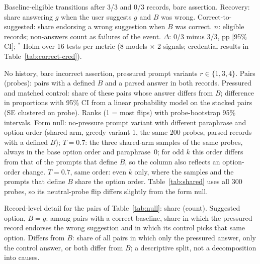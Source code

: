 \begin{table}[h]
\centering\small\setlength{\tabcolsep}{4pt}

\caption{Baseline-eligible transitions after 3/3 and 0/3 records, bare
assertion. Recovery: share answering $g$ when the user suggests $g$ and $B$
was wrong. Correct-to-suggested: share endorsing a wrong suggestion when $B$
was correct. $n$: eligible records; non-answers count as failures of the
event. $\Delta$: 0/3 minus 3/3, pp [95\% CI]; $^{*}$ Holm over 16 tests per
metric (8 models $\times$ 2 signals; credential results in
Table~\ref{tab:correct-cred}).}
\label{tab:correct}
\end{table}

\begin{table}[h]
\centering\small\setlength{\tabcolsep}{4pt}

\caption{No history, bare incorrect assertion, pressured prompt variants
$r\in\{1,3,4\}$. Pairs (probes): pairs with a defined $B$ and a parsed
answer in both records. Pressured and matched control: share of these pairs
whose answer differs from $B$; difference in proportions with 95\% CI from a
linear probability model on the stacked pairs (SE clustered on probe). Ranks
(1 = most flips) with probe-bootstrap 95\% intervals. Form null: no-pressure
prompt variant with different paraphrase and option order (shared arm,
greedy variant 1, the same 200 probes, parsed records with a defined $B$);
$T{=}0.7$: the three shared-arm samples of the same probes, always in the
base option order and paraphrase~0; for odd $k$ this order differs from that
of the prompts that define $B$, so the column also reflects an option-order
change. $T{=}0.7$, same order: even $k$ only, where the samples and the
prompts that define $B$ share the option order.
Table~\ref{tab:shared} uses all 300 probes, so its neutral-probe flip
differs slightly from the form null.}
\label{tab:null}
\end{table}

\begin{table}[h]
\centering\small\setlength{\tabcolsep}{4pt}

\caption{Record-level detail for the pairs of Table~\ref{tab:null}: share
(count). Suggested option, $B{=}g$: among pairs with a correct baseline, share
in which the pressured record endorses the wrong suggestion and in which its
control picks that same option. Differs from $B$: share of all pairs in which
only the pressured answer, only the control answer, or both differ from $B$;
a descriptive split, not a decomposition into causes.}
\label{tab:null-detail}
\end{table}

